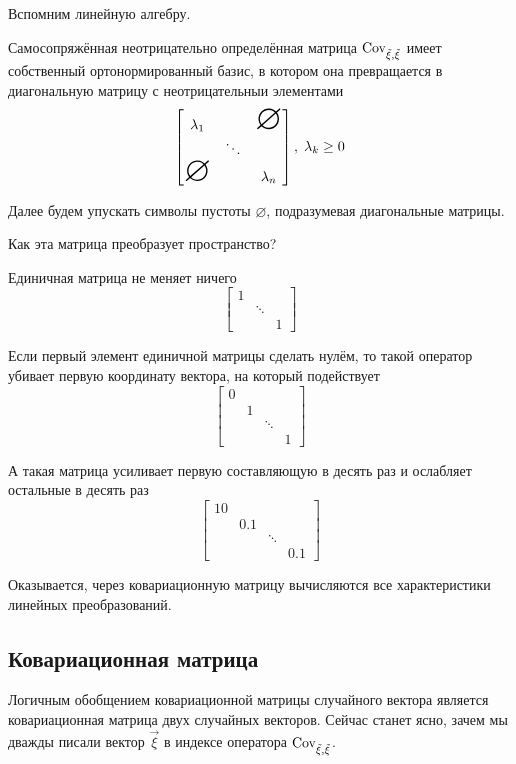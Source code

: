 \begin{remark}\label{remark:linearAlgebra:selfAdjointMatrix}
    Вспомним линейную алгебру.

    Самосопряжённая неотрицательно определённая матрица $\operatorname{Cov^{}_{\vec{\xi}, \vec{\xi}}}$ имеет
    собственный ортонормированный базис, в котором она превращается в
    диагональную матрицу с неотрицательныи элементами
    $$\begin{bmatrix}
        \lambda_1 & & \mbox{\Huge{$\varnothing$}} \\
         & \ddots &  \\
         \mbox{\Huge{$\varnothing$}} & & \lambda_n
    \end{bmatrix},\; \lambda_k \ge 0$$

    Далее будем упускать символы пустоты $\varnothing$,
    подразумевая диагональные матрицы.

    Как эта матрица преобразует пространство?

    Единичная матрица не меняет ничего
    $$\begin{bmatrix}
        1 & &\\
        & \ddots & \\
        & & 1
    \end{bmatrix}$$

    Если первый элемент единичной матрицы сделать нулём, то такой оператор
    убивает первую координату вектора, на который подействует
    $$\begin{bmatrix}
        0 & & & \\
        & 1 & & \\
        & & \ddots & \\
        & & & 1
    \end{bmatrix}$$

    А такая матрица усиливает первую составляющую в десять раз и
    ослабляет остальные в десять раз
    $$\begin{bmatrix}
        10 & & &\\
        & 0.1 & & \\
        & & \ddots & \\
        & & & 0.1
    \end{bmatrix}$$

    Оказывается, через ковариационную матрицу вычисляются все характеристики
    линейных преобразований.
\end{remark}

\subsection{Ковариационная матрица}
\label{section:covMatrix}
Логичным обобщением ковариационной матрицы случайного вектора является
ковариационная матрица двух случайных векторов. Сейчас станет ясно, зачем мы
дважды писали вектор $\vec{\xi}$ в индексе оператора $\operatorname{Cov^{}_{\vec{\xi}, \vec{\xi}}}$.

